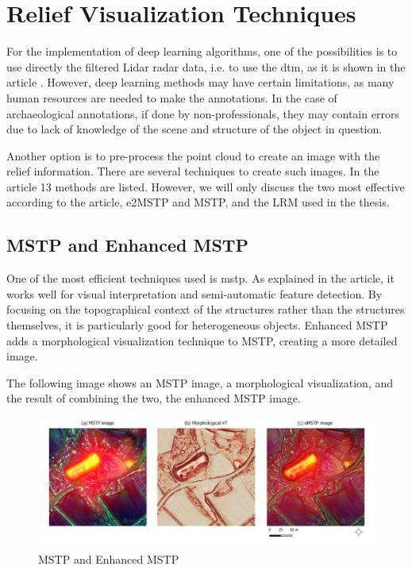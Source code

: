 \section{Relief Visualization Techniques}

For the implementation of deep learning algorithms, one of the possibilities is to use directly the filtered Lidar radar data, i.e. to use the \ac{dtm}, as it is shown in the article \cite{deeplearningRawLidarData}. However, deep learning methods may have certain limitations, as many human resources are needed to make the annotations. In the case of archaeological annotations, if done by non-professionals, they may contain errors due to lack of knowledge of the scene and structure of the object in question. 

Another option is to pre-process the point cloud to create an image with the relief information. There are several techniques to create such images. In the article\cite{reliefModel} 13 methods are listed. However, we will only discuss the two most effective according to the article, e2MSTP and MSTP, and the LRM used in the thesis.

\subsection{MSTP and Enhanced MSTP}
One of the most efficient techniques used is \ac{mstp}. As explained in the \cite{mstp} article, it works well for visual interpretation and semi-automatic feature detection. By focusing on the topographical context of the structures rather than the structures themselves, it is particularly good for heterogeneous objects. Enhanced MSTP adds a morphological visualization technique to MSTP, creating a more detailed image.

The following image shows an MSTP image, a morphological visualization, and the result of combining the two, the enhanced MSTP image.

\begin{figure}[H]
\centering
\includegraphics[width=12cm]{figs/mstp.png}
\caption{MSTP and Enhanced MSTP \cite{emstp}}
\end{figure}

